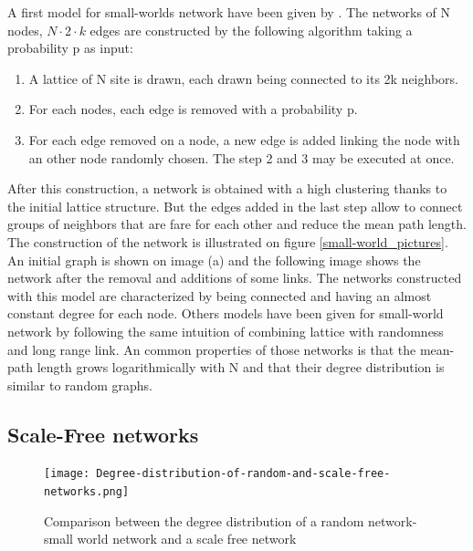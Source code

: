 \documentclass[a4paper, 12pt]{report}
\begin{document}
A first model for small-worlds network have been given by \cite{globalClustering1}. The networks of N nodes, $N \cdot 2 \cdot k$ edges are constructed by the following algorithm taking a probability p as input:
\begin{enumerate}
\item A lattice of N site is drawn, each drawn being connected to its 2k neighbors.
\item For each nodes, each edge is removed with a probability p. 
\item For each edge removed on a node, a new edge is added linking the node with an other node randomly chosen. The step 2 and 3 may be executed at once.
\end{enumerate}
After this construction, a network is obtained with a high clustering thanks to the initial lattice structure. But the edges added in the last step allow to connect groups of neighbors that are fare for each other and reduce the mean path length. The construction of the network is illustrated on figure \ref{small-world_pictures}. An initial graph is shown on image (a) and the following image shows the network after the removal and additions of some links. The networks constructed with this model are characterized by being connected and having an almost constant degree for each node. Others models have been given for small-world network by following the same intuition of combining lattice with randomness and long range link. An common properties of those networks is that the mean-path length grows logarithmically with N and that their degree distribution is similar to random graphs.\citep{small-world, complex_networks}

\subsection{Scale-Free networks}
\begin{figure}
\centering
\texttt{[image: Degree-distribution-of-random-and-scale-free-networks.png]}
\caption{Comparison between the degree distribution of a random network- small world network and a scale free network \citep{scale-free_degree}}
\label{scale-free_degree}
\end{figure}
\end{document}
